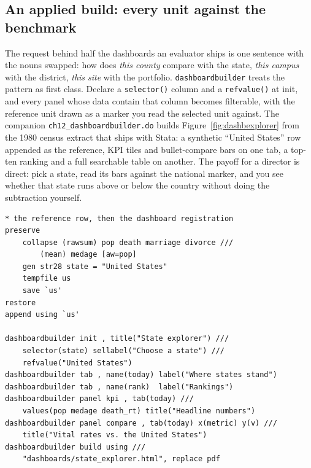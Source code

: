 \documentclass[
    a4paper,
    fontsize=10pt,
    twoside=true,
    numbers=noenddot,
]{kaobook}
\begin{document}
\subsection{An applied build: every unit against the benchmark}
The request behind half the dashboards an evaluator ships is one sentence with the nouns swapped: how does \emph{this county} compare with the state, \emph{this campus} with the district, \emph{this site} with the portfolio. \texttt{dashboardbuilder} treats the pattern as first class. Declare a \texttt{selector()} column and a \texttt{refvalue()} at init, and every panel whose data contain that column becomes filterable, with the reference unit drawn as a marker you read the selected unit against. The companion \texttt{ch12\_dashboardbuilder.do} builds Figure~\ref{fig:dashbexplorer} from the 1980 census extract that ships with Stata: a synthetic \enquote{United States} row appended as the reference, KPI tiles and bullet-compare bars on one tab, a top-ten ranking and a full searchable table on another. The payoff for a director is direct: pick a state, read its bars against the national marker, and you see whether that state runs above or below the country without doing the subtraction yourself.
\par
{\footnotesize
\begin{verbatim}
* the reference row, then the dashboard registration
preserve
    collapse (rawsum) pop death marriage divorce ///
        (mean) medage [aw=pop]
    gen str28 state = "United States"
    tempfile us
    save `us'
restore
append using `us'

dashboardbuilder init , title("State explorer") ///
    selector(state) sellabel("Choose a state") ///
    refvalue("United States")
dashboardbuilder tab , name(today) label("Where states stand")
dashboardbuilder tab , name(rank)  label("Rankings")
dashboardbuilder panel kpi , tab(today) ///
    values(pop medage death_rt) title("Headline numbers")
dashboardbuilder panel compare , tab(today) x(metric) y(v) ///
    title("Vital rates vs. the United States")
dashboardbuilder build using ///
    "dashboards/state_explorer.html", replace pdf
\end{verbatim}
}
\end{document}
